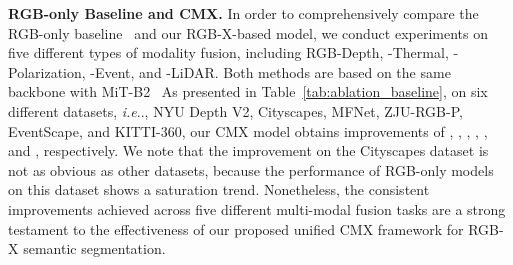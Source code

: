 \documentclass[journal]{IEEEtran}
\makeatletter
\DeclareRobustCommand\onedot{\futurelet\@let@token\@onedot}
\def\@onedot{\ifx\@let@token.\else.\null\fi\xspace}
\def\ie{\emph{i.e}\onedot} \def\Ie{\emph{I.e}\onedot}
\makeatother
\begin{document}
\noindent\textbf{RGB-only Baseline and CMX.}
{In order to comprehensively compare the RGB-only baseline~\cite{xie2021segformer} and our RGB-X-based model, we conduct experiments on five different types of modality fusion, including RGB-Depth, -Thermal, -Polarization, -Event, and -LiDAR. Both methods are based on the same backbone with MiT-B2~\cite{xie2021segformer}  As presented in Table~\ref{tab:ablation_baseline}, on six different datasets, \ie, NYU Depth V2, Cityscapes, MFNet, ZJU-RGB-P, EventScape, and KITTI-360, our CMX model obtains improvements of , , , , , and , respectively. We note that the improvement on the Cityscapes dataset is not as obvious as other datasets, because the performance of RGB-only models on this dataset shows a saturation trend. Nonetheless, the consistent improvements achieved across five different multi-modal fusion tasks are a strong testament to the effectiveness of our proposed unified CMX framework for RGB-X semantic segmentation.}

\begin{table*}[!t]
    \begin{center}
        \caption{\textsc{Comparison between RGB-only baseline and our CMX model for RGB-X semantic segmentation, where all results (mIoU) are based on the same backbone with MiT-B2.}} 
        \label{tab:ablation_baseline}
    \end{center}
\end{table*}
\end{document}
